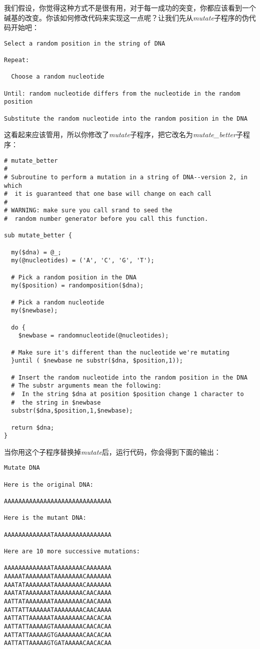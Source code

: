 我们假设，你觉得这种方式不是很有用，对于每一成功的突变，你都应该看到一个碱基的改变。你该如何修改代码来实现这一点呢？让我们先从\textit{mutate}子程序的伪代码开始吧：

\begin{lstlisting}
Select a random position in the string of DNA

Repeat:

  Choose a random nucleotide

Until: random nucleotide differs from the nucleotide in the random position

Substitute the random nucleotide into the random position in the DNA
\end{lstlisting}

这看起来应该管用，所以你修改了\textit{mutate}子程序，把它改名为\textit{mutate\_better}子程序：

\begin{lstlisting}
# mutate_better
#
# Subroutine to perform a mutation in a string of DNA--version 2, in which
#  it is guaranteed that one base will change on each call
#
# WARNING: make sure you call srand to seed the
#  random number generator before you call this function.

sub mutate_better {

  my($dna) = @_;
  my(@nucleotides) = ('A', 'C', 'G', 'T');

  # Pick a random position in the DNA
  my($position) = randomposition($dna);

  # Pick a random nucleotide
  my($newbase);

  do {
    $newbase = randomnucleotide(@nucleotides);

  # Make sure it's different than the nucleotide we're mutating
  }until ( $newbase ne substr($dna, $position,1));

  # Insert the random nucleotide into the random position in the DNA
  # The substr arguments mean the following:
  #  In the string $dna at position $position change 1 character to
  #  the string in $newbase
  substr($dna,$position,1,$newbase);

  return $dna;
}
\end{lstlisting}

当你用这个子程序替换掉\textit{mutate}后，运行代码，你会得到下面的输出：

\begin{lstlisting}
Mutate DNA

Here is the original DNA:

AAAAAAAAAAAAAAAAAAAAAAAAAAAAAA

Here is the mutant DNA:

AAAAAAAAAAAAATAAAAAAAAAAAAAAAA

Here are 10 more successive mutations:

AAAAAAAAAAAAATAAAAAAAACAAAAAAA
AAAAATAAAAAAATAAAAAAAACAAAAAAA
AAATATAAAAAAATAAAAAAAACAAAAAAA
AAATATAAAAAAATAAAAAAAACAACAAAA
AATTATAAAAAAATAAAAAAAACAACAAAA
AATTATTAAAAAATAAAAAAAACAACAAAA
AATTATTAAAAAATAAAAAAAACAACACAA
AATTATTAAAAAGTAAAAAAAACAACACAA
AATTATTAAAAAGTGAAAAAAACAACACAA
AATTATTAAAAAGTGATAAAAACAACACAA
\end{lstlisting}

